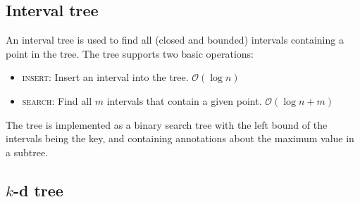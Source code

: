 \subsection{Interval tree}

An interval tree is used to find all (closed and bounded) intervals containing a point in the tree. The tree supports two basic operations:
\begin{itemize}
    \item \textsc{insert:} Insert an interval into the tree. $\mathcal O(\log n)$
    \item \textsc{search:} Find all $m$ intervals that contain a given point. $\mathcal O(\log n + m)$
\end{itemize}
The tree is implemented as a binary search tree with the left bound of the intervals being the key, and containing annotations about the maximum value in a subtree.
\begin{figure}[H]
    \centering
\end{figure}
\vspace{-0.3cm}



\subsection{$k$-d tree}

